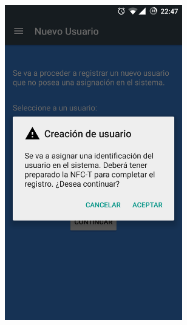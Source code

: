 \documentclass[../PFC.tex]{subfiles}
\begin{document}
\begin{figure}[H]
\centering
	\begin{subfigure}{0.4\textwidth}
		\centering
		\includegraphics[width=0.85\textwidth]{./img/app/nuevoUsuarioDialog}
    \end{subfigure}          
    \qquad\qquad\qquad  %
    \begin{subfigure}{0.4\textwidth}  
       \centering

\end{subfigure}
\end{figure}
\end{document}
